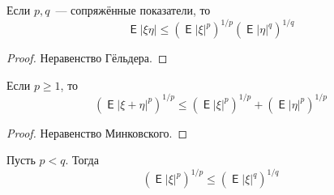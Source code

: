 \documentclass{article}
\DeclareMathOperator{\Expected}{\mathsf{E}}
\begin{document}
    \begin{claim}
        Если $p,q$~--- сопряжённые показатели, то
        $$
        \Expected|\xi\eta|\leqslant(\Expected|\xi|^p)^{1/p}(\Expected|\eta|^q)^{1/q}
        $$
    \end{claim}
    \begin{proof}
        Неравенство Гёльдера.
    \end{proof}
    \begin{claim}
        Если $p\geqslant1$, то
        $$
        (\Expected|\xi+\eta|^p)^{1/p}\leqslant(\Expected|\xi|^p)^{1/p}+(\Expected|\eta|^p)^{1/p}
        $$
    \end{claim}
    \begin{proof}
        Неравенство Минковского.
    \end{proof}
    \begin{claim}
        Пусть $p<q$. Тогда
        $$
        (\Expected|\xi|^p)^{1/p}\leqslant(\Expected|\xi|^q)^{1/q}
        $$
    \end{claim}
\end{document}
